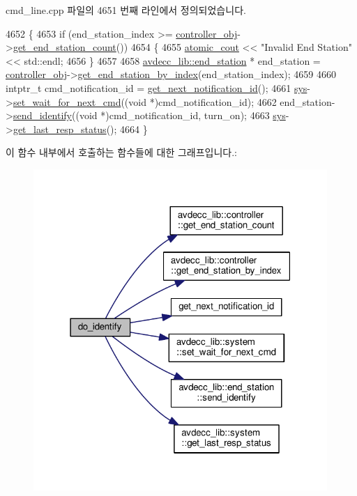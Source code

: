 cmd\+\_\+line.\+cpp 파일의 4651 번째 라인에서 정의되었습니다.


\begin{DoxyCode}
4652 \{
4653     \textcolor{keywordflow}{if} (end\_station\_index >= \hyperlink{classcmd__line_af0a7784509e5bf1210a2aa19cea5df70}{controller\_obj}->\hyperlink{classavdecc__lib_1_1controller_ab5ddf7b4a9718fe3e821289141f44485}{get\_end\_station\_count}())
4654     \{
4655         \hyperlink{cmd__line_8h_a0bc38ccc65c79ba06c6fcd7b4bf554c3}{atomic\_cout} << \textcolor{stringliteral}{"Invalid End Station"} << std::endl;
4656     \}
4657 
4658     \hyperlink{classavdecc__lib_1_1end__station}{avdecc\_lib::end\_station} * end\_station = 
      \hyperlink{classcmd__line_af0a7784509e5bf1210a2aa19cea5df70}{controller\_obj}->\hyperlink{classavdecc__lib_1_1controller_a2a8ec1205ea0d5fdd6f833285257d0d0}{get\_end\_station\_by\_index}(end\_station\_index);
4659 
4660     intptr\_t cmd\_notification\_id = \hyperlink{classcmd__line_a57486218387d1aa9d262eb7c176154ad}{get\_next\_notification\_id}();
4661     \hyperlink{classcmd__line_a485db4800e331cb4052c447fdf5d154e}{sys}->\hyperlink{classavdecc__lib_1_1system_a26b769584f10225077da47583edda33e}{set\_wait\_for\_next\_cmd}((\textcolor{keywordtype}{void} *)cmd\_notification\_id);
4662     end\_station->\hyperlink{classavdecc__lib_1_1end__station_af0d6fb82fdf81914bb248266625f8cea}{send\_identify}((\textcolor{keywordtype}{void} *)cmd\_notification\_id, turn\_on);
4663     \hyperlink{classcmd__line_a485db4800e331cb4052c447fdf5d154e}{sys}->\hyperlink{classavdecc__lib_1_1system_aa63e8d1a4e51f695cdcccc9340922407}{get\_last\_resp\_status}();
4664 \}
\end{DoxyCode}


이 함수 내부에서 호출하는 함수들에 대한 그래프입니다.\+:
\nopagebreak
\begin{figure}[H]
\begin{center}
\leavevmode
\includegraphics[width=316pt]{classcmd__line_a8a57d2f44b2bcd1061685b1d5fb5b271_cgraph}
\end{center}
\end{figure}





